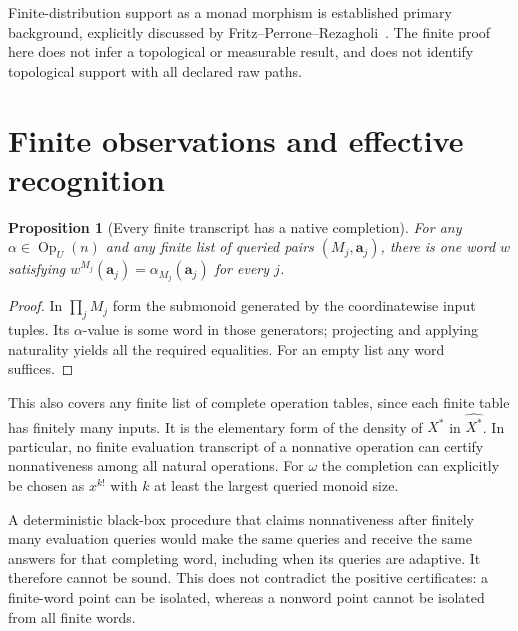 \documentclass[11pt]{article}
\newtheorem{proposition}[theorem]{Proposition}
\theoremstyle{definition}
\theoremstyle{remark}
\newcommand{\Op}{\operatorname{Op}}
\begin{document}
Finite-distribution support as a monad morphism is established primary
background, explicitly discussed by Fritz--Perrone--Rezagholi~\cite{DC-FPR}.
The finite proof here does not infer a topological or measurable result,
and does not identify topological support with all declared raw paths.

\section{Finite observations and effective recognition}
\label{mon-sec:limits}
\begin{proposition}[Every finite transcript has a native completion]
\label{mon-prop:finite-transcript}
For any $\alpha\in\Op_U(n)$ and any finite list of queried pairs
$(M_j,\mathbf a_j)$, there is one word $w$ satisfying
$w^{M_j}(\mathbf a_j)=\alpha_{M_j}(\mathbf a_j)$ for every $j$.
\end{proposition}
\begin{proof}
In $\prod_jM_j$ form the submonoid generated by the coordinatewise input
tuples. Its $\alpha$-value is some word in those generators; projecting
and applying naturality yields all the required equalities. For an empty
list any word suffices.
\end{proof}
This also covers any finite list of complete operation tables, since each
finite table has finitely many inputs. It is the elementary form of the
density of $X^*$ in $\widehat{X^*}$. In particular, no finite evaluation
transcript of a nonnative operation can certify nonnativeness among all
natural operations. For $\omega$ the completion can explicitly be chosen
as $x^{k!}$ with $k$ at least the largest queried monoid size.

A deterministic black-box procedure that claims nonnativeness after
finitely many evaluation queries would make the same queries and receive
the same answers for that completing word, including when its queries
are adaptive. It therefore cannot be sound. This does not contradict the
positive certificates: a finite-word point can be isolated, whereas a
nonword point cannot be isolated from all finite words.
\end{document}
